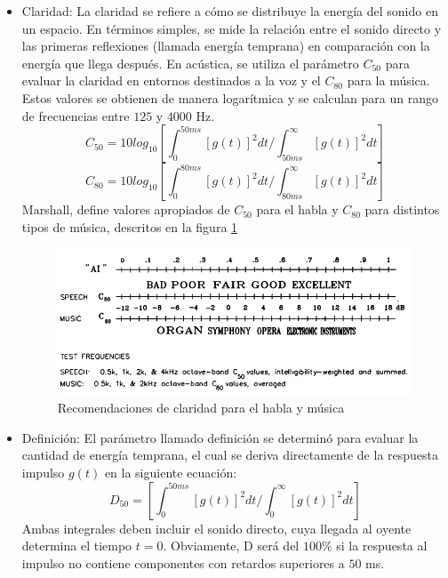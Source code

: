 \begin{itemize}
    \item Claridad: La claridad se refiere a cómo se distribuye la energía del sonido en un espacio. En términos simples, se mide la relación entre el sonido directo y las primeras reflexiones (llamada energía temprana) en comparación con la energía que llega después. En acústica, se utiliza el parámetro $C_{50}$ para evaluar la claridad en entornos destinados a la voz y el $C_{80}$ para la música. Estos valores se obtienen de manera logarítmica y se calculan para un rango de frecuencias entre $125$ y $4000$ Hz.\cite{carrion1990diseno}
    \begin{equation}
      C_{50}= 10 log_{10} \left[\int_0^{50 ms}[g(t)]^2 dt/\int_{50 ms}^{\infty}[g(t)]^2 dt\right]  
    \end{equation}
    \begin{equation}
      C_{80}= 10 log_{10} \left[\int_0^{80 ms}[g(t)]^2 dt/\int_{80 ms}^{\infty}[g(t)]^2 dt\right]  
    \end{equation}
    Marshall, define valores apropiados de $C_{50}$ para el habla y $C_{80}$ para distintos tipos de música, descritos en la figura \ref{fig:Recomendaciones C50 C80} \cite{marshall1994}
    \begin{figure}[H]
        \centering
        \includegraphics[scale=0.5]{Imagenes/MarcoTeorico/Recomendaciones C50-C80.png}
        \caption{Recomendaciones de claridad para el habla y música}
        \label{fig:Recomendaciones C50 C80}
    \end{figure}
    \item Definición: El parámetro llamado definición se determinó para evaluar la cantidad de energía temprana, el cual se deriva directamente de la respuesta impulso $g(t)$ en la siguiente ecuación:
    \begin{equation}
        D_{50}= \left[\int_0^{50 ms}[g(t)]^2 dt/\int_{0}^{\infty}[g(t)]^2 dt\right] 
    \end{equation}
    Ambas integrales deben incluir el sonido directo, cuya llegada al oyente determina el tiempo $t = 0$. Obviamente, D será del $100\%$ si la respuesta al impulso no contiene componentes con retardos superiores a $50$ ms. \cite{Kuttruff_2017} 


\end{itemize}
